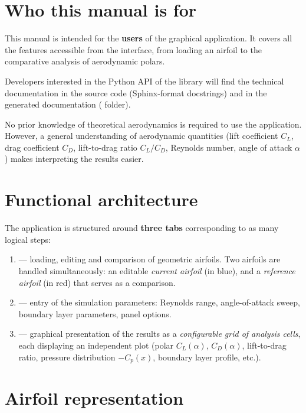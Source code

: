 \section{Who this manual is for}

This manual is intended for the \textbf{users} of the graphical
application. It covers all the features accessible
from the interface, from loading an airfoil to
the comparative analysis of aerodynamic polars.

Developers interested in the Python API of the library
will find the technical documentation in the source code
(Sphinx-format docstrings) and in the generated documentation
( folder).

\begin{noteinfo}
No prior knowledge of theoretical aerodynamics
is required to use the application. However, a
general understanding of aerodynamic quantities (lift
coefficient $C_L$, drag coefficient $C_D$, lift-to-drag ratio $C_L/C_D$,
Reynolds number, angle of attack $\alpha$) makes
interpreting the results easier.
\end{noteinfo}

\section{Functional architecture}

The application is structured around \textbf{three tabs}
corresponding to as many logical steps:

\begin{enumerate}
    \item {} --- loading, editing and comparison of
        geometric airfoils. Two airfoils are handled simultaneously:
        an editable \emph{current airfoil} (in blue), and a
        \emph{reference airfoil} (in red) that serves as a
        comparison.
    \item {} --- entry of the simulation
        parameters: Reynolds range, angle-of-attack sweep,
        boundary layer parameters, panel options.
    \item {} --- graphical presentation of the results
        as a \emph{configurable grid of analysis
        cells}, each displaying an independent plot
        (polar $C_L(\alpha)$, $C_D(\alpha)$, lift-to-drag ratio, pressure
        distribution $-C_p(x)$, boundary layer profile, etc.).
\end{enumerate}

\section{Airfoil representation}

